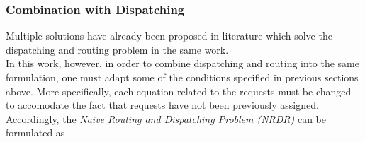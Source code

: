 \subsubsection*{Combination with Dispatching}
Multiple solutions have already been proposed in literature which solve the dispatching and routing problem in the same work. \\
In this work, however, in order to combine dispatching and routing into the same formulation, one must adapt some of the conditions specified in previous sections above. More specifically, each equation related to the requests must be changed to accomodate the fact that requests have not been previously assigned. \\
Accordingly, the \textit{Naive Routing and Dispatching Problem (NRDR)} can be formulated as 

